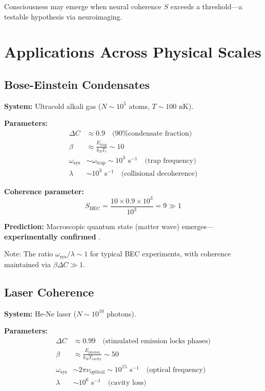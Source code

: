 \documentclass[12pt,a4paper]{article}
\begin{document}
Consciousness may emerge when neural coherence $S$ exceeds a threshold---a testable hypothesis via neuroimaging.

\section{Applications Across Physical Scales}
\label{sec:applications}

\subsection{Bose-Einstein Condensates}

\textbf{System:} Ultracold alkali gas ($N \sim 10^5$ atoms, $T \sim 100$ nK).

\textbf{Parameters:}
\begin{align}
\Delta C &\approx 0.9 \quad \text{(90\% condensate fraction)} \\
\beta &\approx \frac{E_{\text{trap}}}{k_B T_c} \sim 10 \\
\omega_{\text{sys}} &\sim \omega_{\text{trap}} \sim 10^3 \text{ s}^{-1} \quad \text{(trap frequency)} \\
\lambda &\sim 10^3 \text{ s}^{-1} \quad \text{(collisional decoherence)}
\end{align}

\textbf{Coherence parameter:}
\begin{equation}
S_{\text{BEC}} = \frac{10 \times 0.9 \times 10^3}{10^3} = 9 \gg 1
\end{equation}

\textbf{Prediction:} Macroscopic quantum state (matter wave) emerges---\textbf{experimentally confirmed} \citep{cornell1995,ketterle1995}.

Note: The ratio $\omega_{\text{sys}}/\lambda \sim 1$ for typical BEC experiments, with coherence maintained via $\beta \Delta C \gg 1$.

\subsection{Laser Coherence}

\textbf{System:} He-Ne laser ($N \sim 10^{10}$ photons).

\textbf{Parameters:}
\begin{align}
\Delta C &\approx 0.99 \quad \text{(stimulated emission locks phases)} \\
\beta &\approx \frac{E_{\text{photon}}}{k_B T_{\text{cavity}}} \sim 50 \\
\omega_{\text{sys}} &\sim 2\pi \nu_{\text{optical}} \sim 10^{15} \text{ s}^{-1} \quad \text{(optical frequency)} \\
\lambda &\sim 10^6 \text{ s}^{-1} \quad \text{(cavity loss)}
\end{align}
\end{document}

